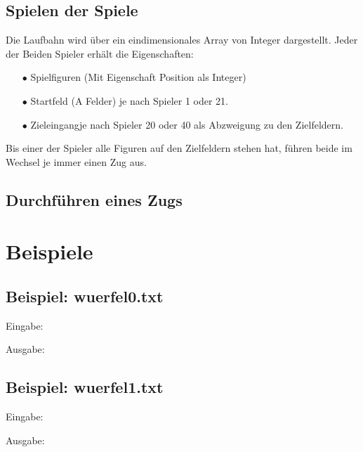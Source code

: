 \documentclass[a4paper,11pt,ngerman]{scrartcl}
\begin{document}
\subsection{Spielen der \glqq Spiele\grqq}
Die Laufbahn wird über ein eindimensionales Array von Integer dargestellt. Jeder der Beiden Spieler erhält die Eigenschaften:
\begin{enumerate}
	\item[$\bullet$] Spielfiguren (Mit Eigenschaft Position als Integer)
	\item[$\bullet$] Startfeld (\glqq A Felder\grqq) je nach Spieler 1 oder 21.
	\item[$\bullet$] \glqq Zieleingang\grqq \space je nach Spieler 20 oder 40 als Abzweigung zu den Zielfeldern.	
\end{enumerate} 
Bis einer der Spieler alle Figuren auf den Zielfeldern stehen hat, führen beide im Wechsel je immer einen Zug aus.
\subsection{Durchführen eines Zugs}


 

\section{Beispiele}
\subsection{Beispiel: wuerfel0.txt}
Eingabe:
\begin{tcolorbox}[center,width=12cm,title=Textfiles/wuerfel0.txt]
	\centering
	
\end{tcolorbox}
Ausgabe:
\centering
\begin{tcolorbox}[center,width=12cm,title=Textfiles/wuerfel0\_result.txt]
	
	
\end{tcolorbox}
\subsection{Beispiel: wuerfel1.txt}
Eingabe:
\begin{tcolorbox}[center,width=12cm,title=Textfiles/wuerfel1.txt]
	\centering
	
\end{tcolorbox}
Ausgabe:
\centering
\begin{tcolorbox}[center,width=12cm,title=Textfiles/wuerfel1\_result.txt]
	
	
\end{tcolorbox}
\end{document}
